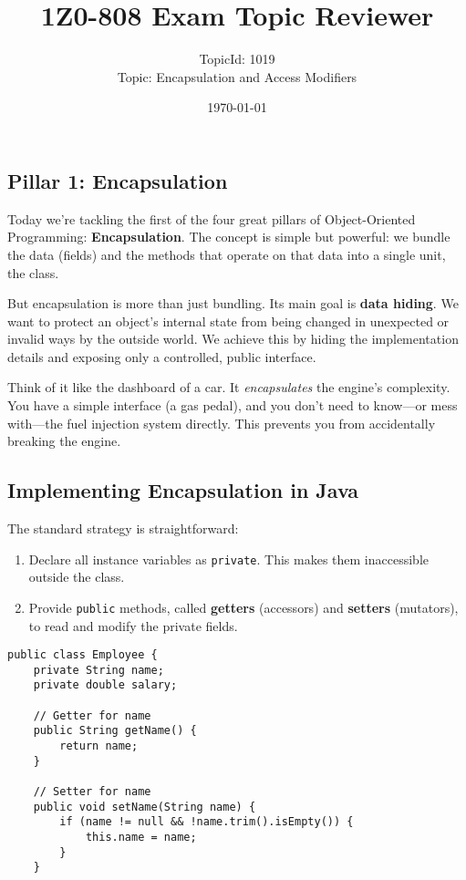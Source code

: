 \documentclass[12pt]{article}
\title{\textbf{1Z0-808 Exam Topic Reviewer}}
\author{TopicId: 1019 \\ Topic: Encapsulation and Access Modifiers}
\date{\today}
\begin{document}
\maketitle
\newpage\begin{enumerate}[label=(\arabic*)]
\section*{Pillar 1: Encapsulation}
Today we're tackling the first of the four great pillars of Object-Oriented Programming: \textbf{Encapsulation}. The concept is simple but powerful: we bundle the data (fields) and the methods that operate on that data into a single unit, the class. 

But encapsulation is more than just bundling. Its main goal is \textbf{data hiding}. We want to protect an object's internal state from being changed in unexpected or invalid ways by the outside world. We achieve this by hiding the implementation details and exposing only a controlled, public interface.

Think of it like the dashboard of a car. It \textit{encapsulates} the engine's complexity. You have a simple interface (a gas pedal), and you don't need to know—or mess with—the fuel injection system directly. This prevents you from accidentally breaking the engine.

\subsection*{Implementing Encapsulation in Java}
The standard strategy is straightforward:
\begin{enumerate}
    \item Declare all instance variables as \texttt{private}. This makes them inaccessible outside the class.
    \item Provide \texttt{public} methods, called \textbf{getters} (accessors) and \textbf{setters} (mutators), to read and modify the private fields.
\end{enumerate}
\begin{verbatim}
public class Employee {
    private String name;
    private double salary;

    // Getter for name
    public String getName() {
        return name;
    }

    // Setter for name
    public void setName(String name) {
        if (name != null && !name.trim().isEmpty()) {
            this.name = name;
        }
    }


\end{verbatim}
\end{enumerate}
\end{document}
